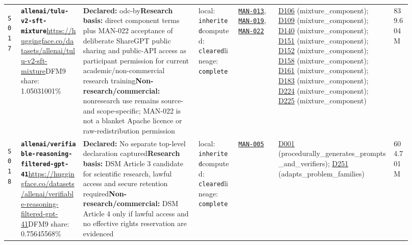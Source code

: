 \documentclass[9pt,a4paper]{article}
\newcommand{\srcid}[1]{\hypertarget{src:#1}{\texttt{#1}}}
\begin{document}
\begin{landscape}
\begin{longtable}{@{}L{0.03\linewidth}L{0.14\linewidth}L{0.26\linewidth}L{0.09\linewidth}L{0.09\linewidth}L{0.265\linewidth}L{0.045\linewidth}@{}}
\srcid{S017} & \textbf{\nolinkurl{allenai/tulu-v2-sft-mixture}}\newline \url{https://huggingface.co/datasets/allenai/tulu-v2-sft-mixture}\newline DFM9 share: 1.05031001\% & \textbf{Declared:} odc-by\newline \textbf{Research basis:} direct component terms plus MAN-022 acceptance of deliberate ShareGPT public sharing and public-API access as participant permission for current academic/non-commercial research training\newline \textbf{Non-research/commercial:} nonresearch use remains source- and scope-specific; MAN-022 is not a blanket Apache licence or raw-redistribution permission & local: \texttt{inherited}\newline computed: \texttt{cleared}\newline lineage: \texttt{complete} & \hyperlink{manual:MAN-013}{\texttt{MAN-013}}, \hyperlink{manual:MAN-019}{\texttt{MAN-019}}, \hyperlink{manual:MAN-022}{\texttt{MAN-022}} & \hyperlink{dep:D106}{D106} (mixture\_component); \hyperlink{dep:D109}{D109} (mixture\_component); \hyperlink{dep:D140}{D140} (mixture\_component); \hyperlink{dep:D151}{D151} (mixture\_component); \hyperlink{dep:D152}{D152} (mixture\_component); \hyperlink{dep:D158}{D158} (mixture\_component); \hyperlink{dep:D161}{D161} (mixture\_component); \hyperlink{dep:D183}{D183} (mixture\_component); \hyperlink{dep:D224}{D224} (mixture\_component); \hyperlink{dep:D225}{D225} (mixture\_component) & 839.604M \\
\srcid{S018} & \textbf{\nolinkurl{allenai/verifiable-reasoning-filtered-gpt-41}}\newline \url{https://huggingface.co/datasets/allenai/verifiable-reasoning-filtered-gpt-41}\newline DFM9 share: 0.75645568\% & \textbf{Declared:} No separate top-level declaration captured\newline \textbf{Research basis:} DSM Article 3 candidate for scientific research, lawful access and secure retention required\newline \textbf{Non-research/commercial:} DSM Article 4 only if lawful access and no effective rights reservation are evidenced & local: \texttt{inherited}\newline computed: \texttt{cleared}\newline lineage: \texttt{complete} & \hyperlink{manual:MAN-005}{\texttt{MAN-005}} & \hyperlink{dep:D001}{D001} (procedurally\_generates\_prompts\_and\_verifiers); \hyperlink{dep:D251}{D251} (adapts\_problem\_families) & 604.701M \\

\end{longtable}
\end{landscape}
\end{document}
